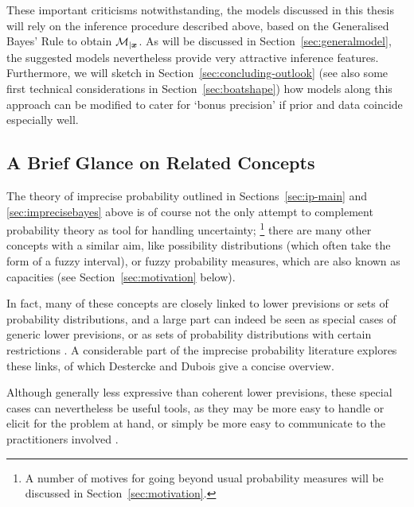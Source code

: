 These important criticisms notwithstanding, 
the models discussed in this thesis will rely on the inference procedure described above,
based on the Generalised Bayes' Rule to obtain $\mathcal{M}_{|{\bm x}}$.
As will be discussed in Section~\ref{sec:generalmodel},
the suggested models nevertheless provide very attractive inference features.
Furthermore, we will sketch in Section~\ref{sec:concluding-outlook}
(see also some first technical considerations in Section~\ref{sec:boatshape})
how models along this approach can be modified to cater for `bonus precision'
if prior and data coincide especially well.


\subsection{A Brief Glance on Related Concepts}
\label{sec:ip-related}

The theory of imprecise probability outlined in Sections~\ref{sec:ip-main} and \ref{sec:imprecisebayes} above
is of course not the only attempt to complement probability theory as tool for handling uncertainty;%
\footnote{A number of motives for going beyond usual probability measures will be discussed in Section~\ref{sec:motivation}.}
there are many other concepts with a similar aim,
like possibility distributions (which often take the form of a fuzzy interval),
or fuzzy probability measures, which are also known as capacities (see Section~\ref{sec:motivation} below).

In fact, many of these concepts are closely linked to
lower previsions or sets of probability distributions,
and a large part can indeed be seen as special cases of generic lower previsions, 
or as sets of probability distributions with certain restrictions
\parencite[Fig.~5.5]{itip-special}.
A considerable part of the imprecise probability literature
explores these links, of which Destercke and Dubois \parencite*{itip-other,itip-special}
give a concise overview.


Although generally less expressive than coherent lower previsions,
these special cases can nevertheless be useful tools,
as they may be more easy to handle or elicit for the problem at hand,
or simply be more easy to communicate to the practitioners involved
\parencite[\S 1]{itip-special}.


